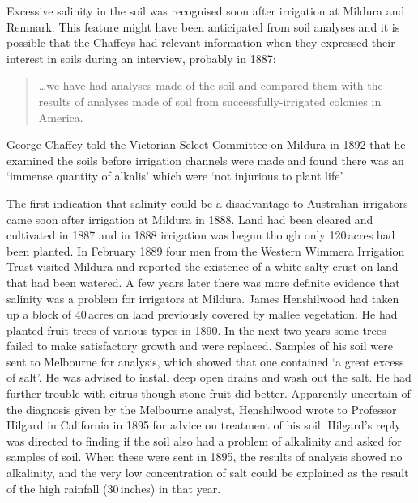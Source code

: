 Excessive salinity in the soil was recognised soon after irrigation at
Mildura and Renmark.  This feature might have been anticipated from
soil analyses  and it is possible that the
Chaffeys had relevant information when they expressed their interest
in soils during an interview, probably in 1887:
\begin{quote}
	\ldots we have had analyses made of the soil and compared them
	with the results of analyses made of soil from
	successfully-irrigat\-ed colonies in
	America.
\end{quote}
George Chaffey told the Victorian Select Committee on Mildura in 1892
that he examined the soils before irrigation channels were made and
found there was an `immense quantity of alkalis' which were `not
injurious to plant life'.

The first indication that salinity could be a disadvantage to
Australian irrigators came soon after irrigation at Mildura
  in 1888.
Land had been cleared and cultivated in 1887 and in 1888 irrigation
was begun though only 120\,acres had been planted.  In February 1889
four men from the Western Wimmera Irrigation Trust
 visited Mildura and
reported the existence of a white salty crust on land that had been
watered. A few years later there was more definite evidence that
salinity  was a problem for irrigators at
Mildura. James Henshilwood   had taken up a
block of 40\,acres on land previously covered by mallee 
vegetation.  He had planted fruit trees of various types in 1890.  In
the next two years some trees failed to make satisfactory growth and
were replaced.  Samples of his soil were sent to Melbourne for
analysis, which showed that one contained `a great excess of salt'.
He was advised to install deep open drains and wash out the salt.  He
had further trouble with citrus though stone fruit did better.
Apparently uncertain of the diagnosis given by the Melbourne analyst,
Henshilwood wrote to Professor Hilgard in California in 1895 for
advice on treatment of his soil.  Hilgard's reply was directed to
finding if the soil also had a problem of alkalinity and asked for
samples of soil.  When these were sent in 1895, the results of
analysis showed no alkalinity,  and the very low
concentration of salt could be explained as the result of the high
rainfall (30\,inches) in that year.

